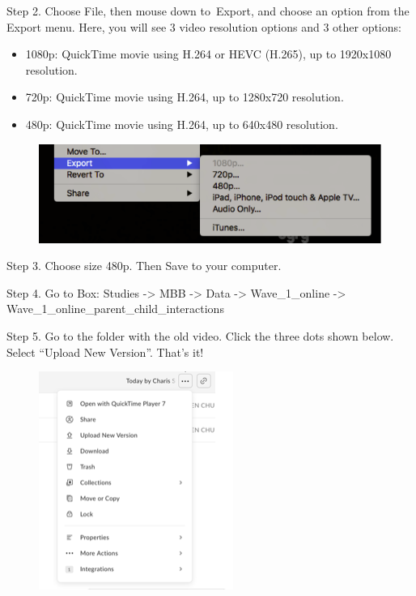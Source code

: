 \documentclass[]{book}
\providecommand{\tightlist}{%
  \setlength{\itemsep}{0pt}\setlength{\parskip}{0pt}}
\begin{document}
Step 2. Choose File, then mouse down to~Export, and choose an option
from the Export menu. Here, you will see 3 video resolution options and
3 other options:

\begin{itemize}
\tightlist
\item
  1080p: QuickTime movie using H.264 or HEVC (H.265), up to 1920x1080
  resolution.
\item
  720p: QuickTime movie using H.264, up to 1280x720 resolution.
\item
  480p: QuickTime movie using H.264, up to 640x480 resolution.
\end{itemize}

\begin{figure}
\centering
\includegraphics{images/lab_protocols/video_resolution/1.png}
\caption{}
\end{figure}

Step 3. Choose size 480p. Then Save to your computer.

Step 4. Go to Box: Studies -\textgreater{} MBB -\textgreater{} Data
-\textgreater{} Wave\_1\_online -\textgreater{}
Wave\_1\_online\_parent\_child\_interactions

Step 5. Go to the folder with the old video. Click the three dots shown
below. Select ``Upload New Version''. That's it!

\begin{figure}
\centering
\includegraphics{images/lab_protocols/video_resolution/2.png}
\caption{}
\end{figure}
\end{document}
